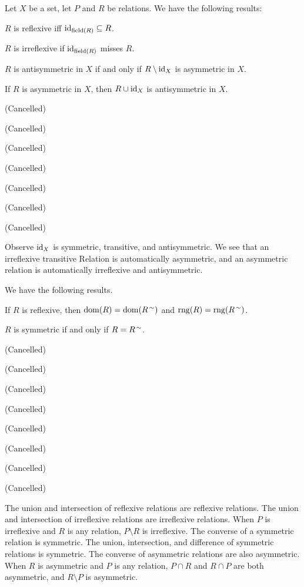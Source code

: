 \documentclass{article}
\begin{document}
Let $X$ be a set, let $P$ and $R$ be relations.
We have the following results:
\begin{thm}
\item\label{relat2:1} $R$ is reflexive iff $\operatorname{id}_{\operatorname{field}(R)}\subseteq R$.
\item\label{relat2:2} $R$ is irreflexive if $\operatorname{id}_{\operatorname{field}(R)}$ misses $R$.
\item\label{relat2:3} $R$ is antisymmetric in $X$ if and only if
  $R\setminus\operatorname{id}_{X}$ is asymmetric in $X$.
\item\label{relat2:4} If $R$ is asymmetric in $X$, then $R\cup\operatorname{id}_{X}$
  is antisymmetric in $X$.
\item\label{relat2:5} (Cancelled)
\item\label{relat2:6} (Cancelled)
\item\label{relat2:7} (Cancelled)
\item\label{relat2:8} (Cancelled)
\item\label{relat2:9} (Cancelled)
\item\label{relat2:10} (Cancelled)
\item\label{relat2:11} (Cancelled)
\end{thm}

Observe $\operatorname{id}_{X}$ is symmetric, transitive, and antisymmetric.
We see that an irreflexive transitive Relation is automatically asymmetric,
and an asymmetric relation is automatically irreflexive and antisymmetric.

We have the following results.
\begin{thm}
\item\label{relat2:12} If $R$ is reflexive, then
  $\operatorname{dom}(R)=\operatorname{dom}(R^{\,\sim})$ and $\operatorname{rng}(R)=\operatorname{rng}(R^{\,\sim})$.
\item\label{relat2:13} $R$ is symmetric if and only if $R=R^{\,\sim}$.
\item\label{relat2:14} (Cancelled)
\item\label{relat2:15} (Cancelled)
\item\label{relat2:16} (Cancelled)
\item\label{relat2:17} (Cancelled)
\item\label{relat2:18} (Cancelled)
\item\label{relat2:19} (Cancelled)
\item\label{relat2:20} (Cancelled)
\item\label{relat2:21} (Cancelled)
\end{thm}

The union and intersection of reflexive relations are reflexive relations.
The union and intersection of irreflexive relations are irreflexive relations.
When $P$ is irreflexive and $R$ is any relation, $P\setminus R$ is irreflexive.
The converse of a symmetric relation is symmetric.
The union, intersection, and difference of symmetric relations is
symmetric.
The converse of asymmetric relations are also asymmetric.
When $R$ is asymmetric and $P$ is any relation, $P\cap R$ and $R\cap P$
are both asymmetric, and $R\setminus P$ is asymmetric.
\end{document}
